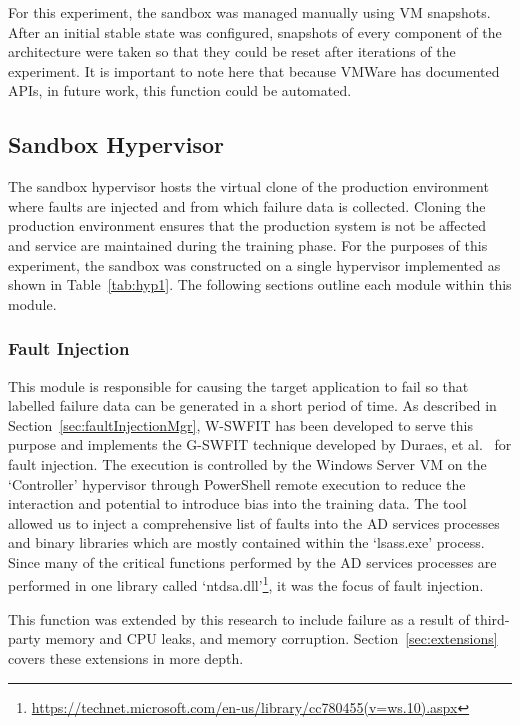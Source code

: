 For this experiment, the sandbox was managed manually using \ac{VM} snapshots.
After an initial stable state was configured, snapshots of every component of
the architecture were taken so that they could be reset after iterations of the
experiment.  It is important to note here that because VMWare has documented
\ac{API}s, in future work, this function could be automated.

\subsection{Sandbox Hypervisor} \label{sec:sandbox}
The sandbox hypervisor hosts the virtual clone of the production environment
where faults are injected and from which failure data is collected.  Cloning
the production environment ensures that the production system is not be
affected and service are maintained during the training phase.  For the
purposes of this experiment, the sandbox was constructed on a single hypervisor
implemented as shown in Table~\ref{tab:hyp1}.  The following sections outline
each module within this module.

\subsubsection{Fault Injection} \label{sec:faultInjectionTool} 
This module is responsible for causing the target application to fail so that
labelled failure data can be generated in a short period of time.  As described
in Section~\ref{sec:faultInjectionMgr}, \ac{W-SWFIT} has been developed to
serve this purpose and implements the \ac{G-SWFIT} technique developed by
Duraes, et al.~\cite{gswfit} for fault injection.  The execution is controlled
by the Windows Server \ac{VM} on the `Controller' hypervisor through PowerShell
remote execution to reduce the interaction and potential to introduce bias into
the training data.  The tool allowed us to inject a comprehensive list of faults
into the \ac{AD} services processes and binary libraries which are mostly
contained within the `lsass.exe' process.  Since many of the critical functions
performed by the \ac{AD} services processes are performed in one library called
`ntdsa.dll'\footnote{\url{https://technet.microsoft.com/en-us/library/cc780455(v=ws.10).aspx}},
it was the focus of fault injection.

This function was extended by this research to include failure as a result of
third-party memory and \ac{CPU} leaks, and memory corruption.
Section~\ref{sec:extensions} covers these extensions in more depth.


